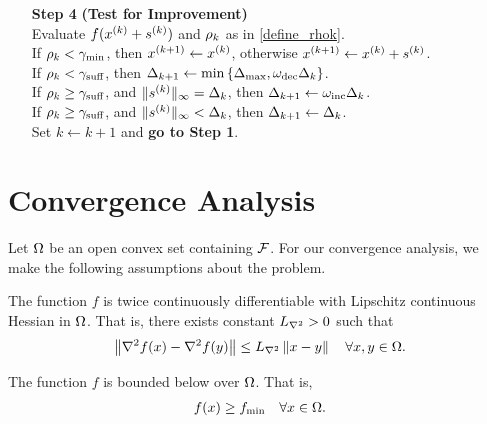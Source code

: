 \documentclass{article}
\begin{document}
{\begin{fullwidth}[leftmargin=0in, rightmargin=0in, width=\linewidth-0.5in]
\begin{flushleft}
\begin{algorithm}[H]
\begin{itemize}
 		
        \item[\textbf{Step 4}] \textbf{(Test for Improvement)} \\
            Evaluate $f(x^{(k)} + {{s}^{(k)}})$ and $\rho_k$ as in \cref{define_rhok}. \\
		   If $\rho_k < \gamma_{\textrm{min}}$, then ${{x}^{(k+1)}} \gets x^{(k)}$, otherwise ${{x}^{(k+1)}} \gets x^{(k)} + {{s}^{(k)}}$. \\
            If $\rho_k < \gamma_{\textrm{suff}}$, then $\Delta_{k+1} \gets \min\left\{{\Delta_{\textrm{max}}}, \omega_{\text{dec}}\Delta_k\right\}$. \\
            If $\rho_k \ge \gamma_{\textrm{suff}}$, and $\|{{s}^{(k)}}\|_{\infty} = \Delta_k$, then $\Delta_{k+1} \gets \omega_{\text{inc}}\Delta_k$. \\
            If $\rho_k \ge \gamma_{\textrm{suff}}$, and $\|{{s}^{(k)}}\|_{\infty} < \Delta_k$, then $\Delta_{k+1} \gets \Delta_k$. \\
            Set $k \gets k+1$ and {\bf go to Step 1}.
    \end{itemize}
\end{algorithm}

\end{flushleft}
\end{fullwidth}
}
 
 
\section{Convergence Analysis}
\label{linear_convergence_discussion} 

Let $\Omega$ be an open convex set containing ${\mathcal F}$. 
For our convergence analysis,   we make the following assumptions about the problem.


\begin{assumption}
\label{for_fully_quadratic}
\label{lipschitz_hessian}
The function $f$ is twice continuously differentiable with Lipschitz continuous Hessian in $\Omega$.   That is, there exists constant ${L_{\nabla^2}} > 0$ such that 
\begin{align}
\left\|\nabla^2 f(x) - \nabla^2 f(y)\right\| \le {L_{\nabla^2}} \left\|x - y\right\| \quad \forall x, y \in \Omega.
\end{align}
\end{assumption}




\begin{assumption}
\label{lower_bound}
The function $f$ is bounded below over $\Omega$.
That is,
\begin{align}
f(x) \ge f_{\text{min}} \quad \forall x \in \Omega.
\end{align}
\end{assumption}
\end{document}
